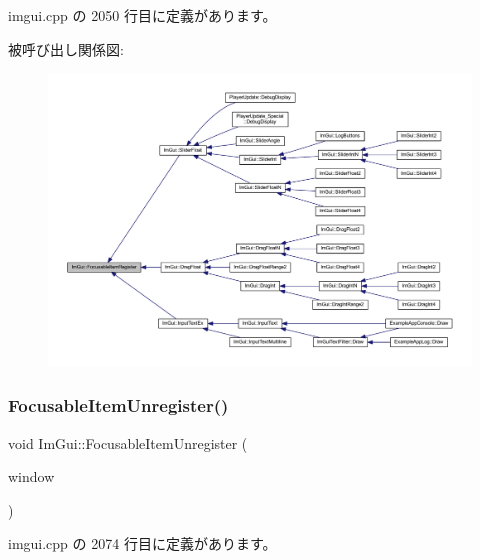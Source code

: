  imgui.\+cpp の 2050 行目に定義があります。

被呼び出し関係図\+:\nopagebreak
\begin{figure}[H]
\begin{center}
\leavevmode
\includegraphics[width=350pt]{namespace_im_gui_ab1e2f7069edbab669b56e93e30930c45_icgraph}
\end{center}
\end{figure}
\mbox{\label{namespace_im_gui_a390518fcaef04b4d399d2475d4d84df7}} 
\subsubsection{\texorpdfstring{Focusable\+Item\+Unregister()}{FocusableItemUnregister()}}
{\footnotesize\ttfamily void Im\+Gui\+::\+Focusable\+Item\+Unregister (\begin{DoxyParamCaption}\item[{\mbox{\hyperlink{struct_im_gui_window}{Im\+Gui\+Window}} $\ast$}]{window }\end{DoxyParamCaption})}



 imgui.\+cpp の 2074 行目に定義があります。

